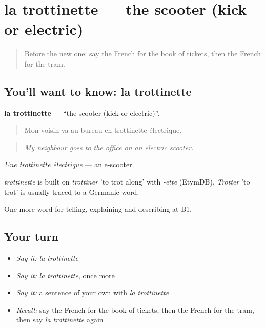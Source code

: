 \section[la trottinette]{la trottinette — the scooter (kick or electric)}

\label{lesson:FR-C415-trottinette}



\begin{quote}
Before the new one: say the French for the book of tickets, then the French for the tram.
\end{quote}

\subsection*{You'll want to know: la trottinette}
\textbf{la trottinette} — \textquotedblleft{}the scooter (kick or electric)\textquotedblright{}.

\begin{quote}
Mon voisin va au bureau en trottinette électrique.
\end{quote}

\begin{quote}
\emph{My neighbour goes to the office on an electric scooter.}
\end{quote}

\emph{Une trottinette électrique} — an e-scooter.

\begin{cousinweb}
\emph{trottinette} is built on \emph{trottiner} 'to trot along' with \emph{-ette} (EtymDB). \emph{Trotter} 'to trot' is usually traced to a Germanic word.
\end{cousinweb}

\begin{grammarlens}[title={What you've built}]
One more word for telling, explaining and describing at B1.
\end{grammarlens}

\subsection*{Your turn}
\begin{itemize}
\raggedright
  \item \emph{Say it:} \emph{la trottinette}
  \item \emph{Say it:} \emph{la trottinette}, once more
  \item \emph{Say it:} a sentence of your own with \emph{la trottinette}
  \item \emph{Recall:} say the French for the book of tickets, then the French for the tram, then say \emph{la trottinette} again
\end{itemize}


